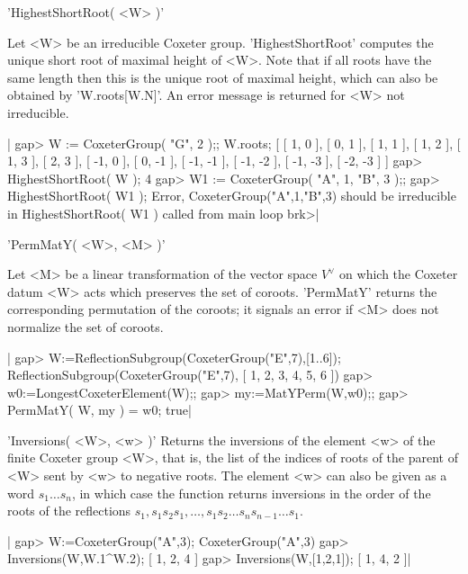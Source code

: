 
'HighestShortRoot( <W> )'

Let <W> be an irreducible Coxeter  group. 'HighestShortRoot' computes the
unique short root of maximal height of <W>.  Note that  if all roots have
the same length then this is the unique root of maximal height, which can
also be obtained by 'W.roots[W.N]'.  An error message is returned for <W>
not irreducible.

|    gap> W := CoxeterGroup( "G", 2 );;  W.roots;
    [ [ 1, 0 ], [ 0, 1 ], [ 1, 1 ], [ 1, 2 ], [ 1, 3 ], [ 2, 3 ],
      [ -1, 0 ], [ 0, -1 ], [ -1, -1 ], [ -1, -2 ], [ -1, -3 ],
      [ -2, -3 ] ]
    gap> HighestShortRoot( W );
    4
    gap> W1 := CoxeterGroup( "A", 1, "B", 3 );;
    gap> HighestShortRoot( W1 );
    Error, CoxeterGroup("A",1,"B",3) should be irreducible
     in
    HighestShortRoot( W1 ) called from
    main loop
    brk>|


'PermMatY( <W>, <M> )'

Let <M> be a linear transformation of  the vector space $V^\vee$ on which
the Coxeter    datum  <W> acts  which  preserves    the  set of  coroots.
'PermMatY'  returns  the  corresponding permutation of    the coroots; it
signals an error if <M> does not normalize the set of coroots.

|    gap>  W:=ReflectionSubgroup(CoxeterGroup("E",7),[1..6]);
    ReflectionSubgroup(CoxeterGroup("E",7), [ 1, 2, 3, 4, 5, 6 ])
    gap>  w0:=LongestCoxeterElement(W);;
    gap> my:=MatYPerm(W,w0);;
    gap> PermMatY( W, my ) = w0;
    true|


'Inversions( <W>, <w> )'
Returns  the inversions of the element <w> of the finite Coxeter group <W>,
that  is, the list of the indices of roots of the parent of <W> sent by <w>
to  negative roots. The element <w> can  also be given as a word $s_1\ldots
s_n$,  in which case  the function returns  inversions in the  order of the
roots  of  the  reflections  $s_1,  s_1  s_2  s_1,\ldots,s_1  s_2\ldots s_n
s_{n-1}\ldots s_1$.

|    gap> W:=CoxeterGroup("A",3);
    CoxeterGroup("A",3)
    gap> Inversions(W,W.1^W.2);
    [ 1, 2, 4 ]
    gap> Inversions(W,[1,2,1]);
    [ 1, 4, 2 ]|


